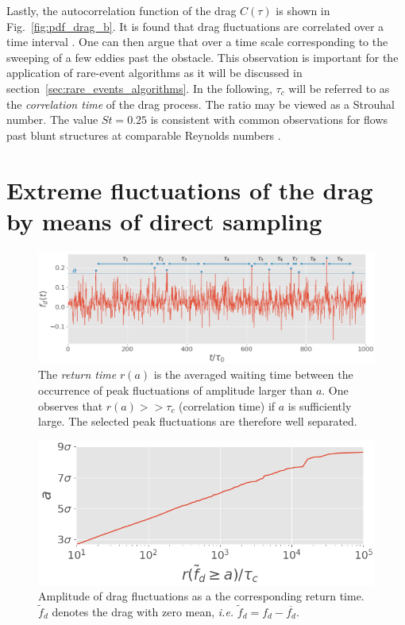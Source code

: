 \documentclass{jfm}
\newcommand{\EL}[1]{{\color{myred}{#1}}}
\begin{document}
Lastly, the autocorrelation function of the drag $C(\tau)$ is shown in Fig.~\ref{fig:pdf_drag_b}. It is found that drag fluctuations are correlated over a time interval \EL{$\tau_c \simeq 4T_0$}. One can then argue that \EL{the drag loses its memory}  over a time scale corresponding to the sweeping of a few eddies past the obstacle.
% 
This observation is important for the application of rare-event algorithms as it will be discussed in section~\ref{sec:rare_events_algorithms}.
% 
In the following, $\tau_c$ will be referred to as the \textit{correlation time} of the drag process.
The ratio \EL{$T_0 / \tau_c$} may be viewed as a {Strouhal number}. The value $St=0.25$ is consistent with common observations for flows past blunt structures at comparable Reynolds numbers \citep{rodi1998}.

\section{Extreme fluctuations of the drag by means of direct sampling}
\label{sec:direct_sampling}

\begin{figure}
  \centering
  \includegraphics[width=\linewidth]{illustrate_return_time/illustrate_return_time}
  \caption{\label{fig:illustrate_return_time} {The \textit{return time} $r(a)$  is the averaged waiting time between the occurrence of peak fluctuations of amplitude larger than $a$.
      One observes that $r(a) >> \tau_c$ (correlation time) if $a$ is sufficiently large. The selected peak fluctuations are therefore well separated.}
  }
\end{figure}

\begin{figure}
  \centering
  \includegraphics[width=.6\linewidth]{return_time/return_time.png}
  \caption{Amplitude of drag fluctuations as a \EL{function of} the corresponding return time. $\tilde{f}_d$ denotes the drag with zero mean, \textit{i.e.} $\tilde{f}_d = f_d - \overline{f_d}$.
  }
  \label{fig:return_time_instant}
\end{figure}
\end{document}
